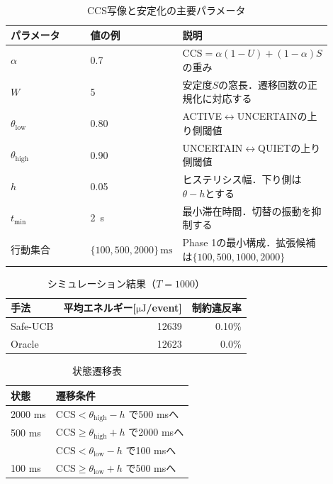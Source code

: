 \documentclass[a4paper,12pt]{ltjsreport}
\begin{document}
\begin{table}[tb]
  \centering
  \caption{CCS写像と安定化の主要パラメータ}
  \label{tab:ccs_params_phase1}
  \begin{tabular}{p{0.28\linewidth}p{0.18\linewidth}p{0.44\linewidth}}
    \toprule
    パラメータ & 値の例 & 説明 \\
    \midrule
    $\alpha$ & 0.7 & $\mathrm{CCS}=\alpha(1-U)+(1-\alpha)S$ の重み \\
    $W$ & 5 & 安定度$S$の窓長．遷移回数の正規化に対応する \\
    $\theta_{\mathrm{low}}$ & 0.80 & ACTIVE$\leftrightarrow$UNCERTAINの上り側閾値 \\
    $\theta_{\mathrm{high}}$ & 0.90 & UNCERTAIN$\leftrightarrow$QUIETの上り側閾値 \\
    $h$ & 0.05 & ヒステリシス幅．下り側は$\theta-h$とする \\
    $t_{\min}$ & \SI{2}{\second} & 最小滞在時間．切替の振動を抑制する \\
    行動集合 & $\{100,\allowbreak 500,\allowbreak 2000\}\,\si{\milli\second}$ & Phase 1の最小構成．拡張候補は$\{100,\allowbreak 500,\allowbreak 1000,\allowbreak 2000\}$ \\
    \bottomrule
  \end{tabular}
\end{table}
\clearpage
\clearpage
\begin{table}[tb]
  \centering
  \caption{シミュレーション結果（$T=1000$）}
  \begin{tabular}{lrr}
    \toprule
    手法 & 平均エネルギー[$\si{\micro\joule}$/event] & 制約違反率 \\
    \midrule
    Safe-UCB & 12639 & 0.10\% \\
    Oracle & 12623 & 0.0\% \\
    \bottomrule
  \end{tabular}
\end{table}
\clearpage
\clearpage
\begin{table}[tb]
  \centering
  \caption{状態遷移表}
  \begin{tabular}{ll}
    \toprule
    状態 & 遷移条件 \\
    \midrule
    2000 ms & $\mathrm{CCS}<\theta_{\mathrm{high}}-h$ で500 msへ \\
    500 ms & $\mathrm{CCS}\ge\theta_{\mathrm{high}}+h$ で2000 msへ \\
           & $\mathrm{CCS}<\theta_{\mathrm{low}}-h$ で100 msへ \\
    100 ms & $\mathrm{CCS}\ge\theta_{\mathrm{low}}+h$ で500 msへ \\
    \bottomrule
  \end{tabular}
\end{table}
\end{document}
